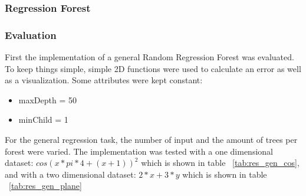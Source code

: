 \subsubsection*{Regression Forest} %
\label{ssub:regression_forest}


\subsubsection{Evaluation} %
\label{ssub:camera_relocalization}
First the implementation of a general Random Regression Forest was evaluated. To keep things simple, simple 2D functions were used to calculate an error as well as a visualization.
Some attributes were kept constant:
\begin{itemize}
	\item maxDepth = 50
  \item minChild = 1
\end{itemize}

For the general regression task, the number of input and the amount of trees per forest were varied. The implementation was tested with a one dimensional dataset: $cos(x*pi*4 + (x+1))^2$ which is shown in table ~\ref{tab:res_gen_cos}, and with a two dimensional dataset: $2*x + 3*y$ which is shown in table ~\ref{tab:res_gen_plane}

